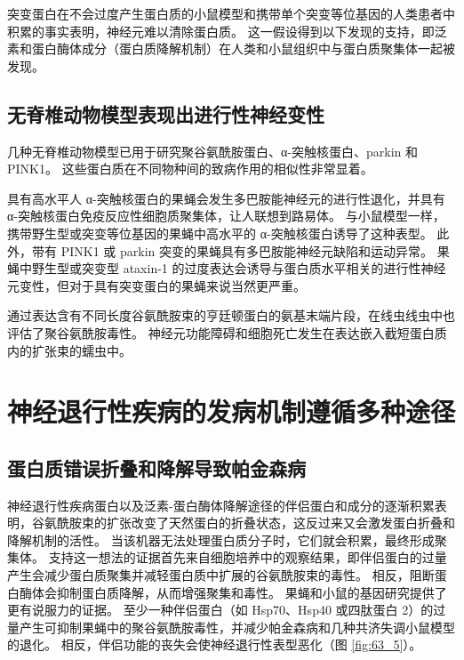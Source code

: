 突变蛋白在不会过度产生蛋白质的小鼠模型和携带单个突变等位基因的人类患者中积累的事实表明，神经元难以清除蛋白质。 这一假设得到以下发现的支持，即泛素和蛋白酶体成分（蛋白质降解机制）在人类和小鼠组织中与蛋白质聚集体一起被发现。

\subsection{无脊椎动物模型表现出进行性神经变性}

几种无脊椎动物模型已用于研究聚谷氨酰胺蛋白、α-突触核蛋白、parkin 和 PINK1。 这些蛋白质在不同物种间的致病作用的相似性非常显着。

具有高水平人 α-突触核蛋白的果蝇会发生多巴胺能神经元的进行性退化，并具有 α-突触核蛋白免疫反应性细胞质聚集体，让人联想到路易体。 与小鼠模型一样，携带野生型或突变等位基因的果蝇中高水平的 α-突触核蛋白诱导了这种表型。 此外，带有 PINK1 或 parkin 突变的果蝇具有多巴胺能神经元缺陷和运动异常。 果蝇中野生型或突变型 ataxin-1 的过度表达会诱导与蛋白质水平相关的进行性神经元变性，但对于具有突变蛋白的果蝇来说当然更严重。

通过表达含有不同长度谷氨酰胺束的亨廷顿蛋白的氨基末端片段，在线虫线虫中也评估了聚谷氨酰胺毒性。 神经元功能障碍和细胞死亡发生在表达嵌入截短蛋白质内的扩张束的蠕虫中。

\section{神经退行性疾病的发病机制遵循多种途径}
\subsection{蛋白质错误折叠和降解导致帕金森病}
神经退行性疾病蛋白以及泛素-蛋白酶体降解途径的伴侣蛋白和成分的逐渐积累表明，谷氨酰胺束的扩张改变了天然蛋白的折叠状态，这反过来又会激发蛋白折叠和降解机制的活性。 当该机器无法处理蛋白质分子时，它们就会积累，最终形成聚集体。 支持这一想法的证据首先来自细胞培养中的观察结果，即伴侣蛋白的过量产生会减少蛋白质聚集并减轻蛋白质中扩展的谷氨酰胺束的毒性。 相反，阻断蛋白酶体会抑制蛋白质降解，从而增强聚集和毒性。 果蝇和小鼠的基因研究提供了更有说服力的证据。 至少一种伴侣蛋白（如 Hsp70、Hsp40 或四肽蛋白 2）的过量产生可抑制果蝇中的聚谷氨酰胺毒性，并减少帕金森病和几种共济失调小鼠模型的退化。 相反，伴侣功能的丧失会使神经退行性表型恶化（图 \ref{fig:63_5}）。

